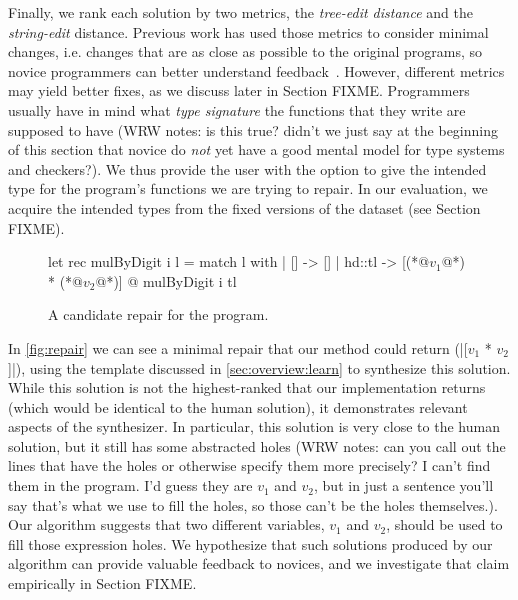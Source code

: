  Finally, we rank each solution by two metrics, the
\emph{tree-edit distance} and the \emph{string-edit} distance. Previous work has
used those metrics to consider minimal changes, i.e. changes that are as close
as possible to the original programs, so novice programmers can better
understand feedback~\cite{FIXME}. 
However, different metrics may yield better fixes, as we
discuss later in Section FIXME. 
Programmers usually have in mind what \emph{type signature}
the functions that they write are supposed to have
(WRW notes: is this true? didn't we just say at the beginning of this
section that novice do \emph{not} yet have a good mental model for
type systems and checkers?). We thus 
provide the user with the option to give the intended type for the program's
functions we are trying to repair. In our evaluation, we acquire the
intended types from the fixed versions of the dataset (see Section FIXME).

\begin{figure}[ht]
  \begin{ecode}
  let rec mulByDigit i l =
    match l with
    | []     -> []
    | hd::tl -> [(*@$v_1$@*) * (*@$v_2$@*)] @ mulByDigit i tl
  \end{ecode}
  \caption{A candidate repair for the \mbd program.}
  \label{fig:repair}
  \end{figure}

 In \autoref{fig:repair} we can see a minimal repair that our
method could return (|[$v_1$ * $v_2$]|), using the template discussed in
\autoref{sec:overview:learn} to synthesize this solution. While this solution
is not the highest-ranked that our implementation returns (which would be
identical to the human solution), it demonstrates 
relevant aspects of the synthesizer. In particular, this solution
is very close to the human solution, but it still has 
some abstracted holes (WRW notes: can you call out the lines that have the
holes or otherwise specify them more precisely? I can't find them in the
program. I'd guess they are $v_1$ and $v_2$, but in just a sentence you'll
say that's what we use to fill the holes, so those can't be the holes
themselves.). 
Our algorithm suggests that two different variables, $v_1$ and $v_2$,
should be used to fill those expression holes. We hypothesize that 
such solutions produced by our algorithm can provide 
valuable feedback to novices, and we investigate that claim empirically
in Section FIXME.
